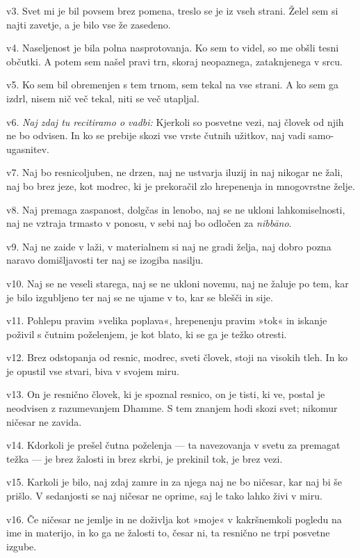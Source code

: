 v3. Svet mi je bil povsem brez pomena, treslo se je iz vseh strani. Želel sem si najti zavetje, a je bilo vse že zasedeno.

v4. Naseljenost je bila polna nasprotovanja. Ko sem to videl, so me obšli tesni občutki. A potem sem našel pravi trn, skoraj neopaznega, zataknjenega v srcu.

v5. Ko sem bil obremenjen s tem trnom, sem tekal na vse strani. A ko sem ga izdrl, nisem nič več tekal, niti se več utapljal.

v6. \emph{Naj zdaj tu recitiramo o vadbi:} Kjerkoli so posvetne vezi, naj človek od njih ne bo odvisen. In ko se prebije skozi vse vrste čutnih užitkov, naj vadi samo-ugasnitev.

v7. Naj bo resnicoljuben, ne drzen, naj ne ustvarja iluzij in naj nikogar ne žali, naj bo brez jeze, kot modrec, ki je prekoračil zlo hrepenenja in mnogovrstne želje.

v8. Naj premaga zaspanost, dolgčas in lenobo, naj se ne ukloni lahkomiselnosti, naj ne vztraja trmasto v ponosu, v sebi naj bo odločen za \emph{nibbāno}.

v9. Naj ne zaide v laži, v materialnem si naj ne gradi želja, naj dobro pozna naravo domišljavosti ter naj se izogiba nasilju.

v10. Naj se ne veseli starega, naj se ne ukloni novemu, naj ne žaluje po tem, kar je bilo izgubljeno ter naj se ne ujame v to, kar se blešči in sije.

v11. Pohlepu pravim »velika poplava«, hrepenenju pravim »tok« in iskanje poživil s čutnim poželenjem, je kot blato, ki se ga je težko otresti.

v12. Brez odstopanja od resnic, modrec, sveti človek, stoji na visokih tleh. In ko je opustil vse stvari, biva v svojem miru.

v13. On je resnično človek, ki je spoznal resnico, on je tisti, ki ve, postal je neodvisen z razumevanjem Dhamme. S tem znanjem hodi skozi svet; nikomur ničesar ne zavida.

v14. Kdorkoli je prešel čutna poželenja --- ta navezovanja v svetu za premagat težka --- je brez žalosti in brez skrbi, je prekinil tok, je brez vezi.

v15. Karkoli je bilo, naj zdaj zamre in za njega naj ne bo ničesar, kar naj bi še prišlo. V sedanjosti se naj ničesar ne oprime, saj le tako lahko živi v miru.

v16. Če ničesar ne jemlje in ne doživlja kot »moje« v kakršnemkoli pogledu na ime in materijo, in ko ga ne žalosti to, česar ni, ta resnično ne trpi posvetne izgube.

